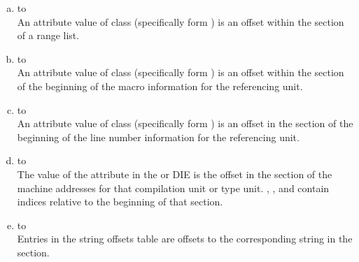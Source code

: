 \begin{enumerate}[(a)]
\item \dotdebuginfo{} to \dotdebugranges \\
An attribute value of class  
(specifically form
\DWFORMsecoffset) 
is an offset within the \dotdebugranges{} section of
a range list.

\item \dotdebuginfo{} to \dotdebugmacinfo \\
An attribute value of class 
 (specifically form
\DWFORMsecoffset) is an 
offset within the 
\dotdebugmacinfo{} section
of the beginning of the macro information for the referencing unit.

\item \dotdebuginfo{} to \dotdebugline \\
An attribute value of class 
 (specifically form
\DWFORMsecoffset) 
is an offset in the 
\dotdebugline{} section of the
beginning of the line number information for the referencing unit.

\item \dotdebuginfo{} to \dotdebugaddr \\
The value of the \DWATaddrbase{} attribute in the
\DWTAGcompileunit{} or \DWTAGpartialunit{} DIE is the
offset in the \dotdebugaddr{} section of the machine
addresses for that compilation unit or type unit.
\DWFORMaddrx, \DWOPaddrx, and \DWOPconstx{} contain
indices relative to the beginning of that section.

\item \dotdebugstroffsets{} to \dotdebugstr \\
Entries in the string offsets table
are offsets to the corresponding string in the 
\dotdebugstr{} section.

\end{enumerate}
